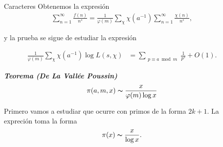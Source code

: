 \documentclass[final]{beamer}
\newlength{\sepwidth}
\newlength{\colwidth}
\newcommand{\separatorcolumn}{\begin{column}{\sepwidth}\end{column}}
\newcommand{\defi}[1]{\textbf{\emph{#1}}}
\begin{document}
\begin{frame}[t,fragile]
\begin{columns}[t]
\begin{column}{\colwidth}
\begin{block}{Caracteres}
Obtenemos la expresión
    \begin{align*}
    \sum_{n=1}^{\infty}\frac{f(n)}{n^s}=\frac{1}{\varphi(m)}\sum_{\chi}\chi(a^{-1})\sum_{n=1}^{\infty}\frac{\chi(n)}{n^s}
,\end{align*}

y la prueba se sigue de estudiar la expresión

\begin{align*}
    \frac{1}{\varphi(m)} \sum_{\chi} \chi(a^{-1}) \log L(s, \chi)
&=\sum_{\substack{p \equiv a\bmod{m}}} \frac{1}{p^s} + O(1)
.\end{align*}
\begin{exampleblock}
    {}\defi{Teorema (De La Vallée Poussin) }$$\pi(a,m,x)\thicksim \dfrac{x}{\varphi(m)\log x}$$
\end{exampleblock}
Primero vamos a estudiar que ocurre con primos de la forma $2k+1$. La expreción toma la forma
$$\pi(x)\thicksim \dfrac{x}{\log x}.$$
\end{block}
\end{column}

\separatorcolumn


\end{columns}
\end{frame}
\end{document}
